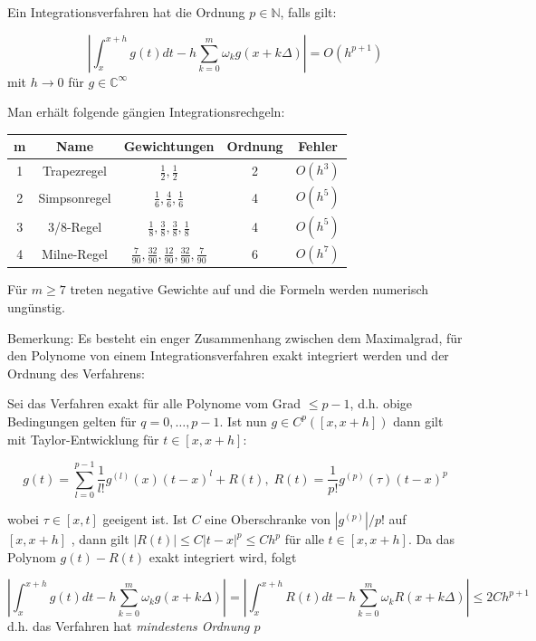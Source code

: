 \documentclass[10pt,a4paper]{article}
\begin{document}
\begin{defi}
Ein Integrationsverfahren hat die Ordnung $p \in \mathbb{N}$, falls gilt:

$$|\int^{x+h}_{x} g(t) dt - h \sum^{m}_{k=0} \omega_k g(x+k\Delta)| = O(h^{p+1})$$ mit $h \rightarrow 0$ für $g \in \mathbb{C}^{\infty}$
\end{defi}

Man erhält folgende gängien Integrationsrechgeln:

\begin{table}[H]
\centering
\begin{tabular}{ |c c c c c| }
\hline
  m & Name & Gewichtungen & Ordnung & Fehler \\
  \hline \hline
  1 & Trapezregel & $\frac{1}{2},\frac{1}{2}$ & 2 & $O(h^{3})$\\
  2 & Simpsonregel & $\frac{1}{6},\frac{4}{6},\frac{1}{6}$ & 4 & $O(h^{5})$\\
  3 & 3/8-Regel & $\frac{1}{8},\frac{3}{8},\frac{3}{8},\frac{1}{8}$ & 4 & $O(h^{5})$\\
  4 & Milne-Regel & $\frac{7}{90},\frac{32}{90},\frac{12}{90},\frac{32}{90},\frac{7}{90}$ &6 & $O(h^{7})$\\
  \hline
\end{tabular}
\end{table}

Für $m\geq 7$ treten negative Gewichte auf und die Formeln werden numerisch ungünstig.

Bemerkung: Es besteht ein enger Zusammenhang zwischen dem Maximalgrad, für den Polynome von einem Integrationsverfahren exakt integriert werden und der Ordnung des Verfahrens:

Sei das Verfahren exakt für alle Polynome vom Grad $\leq p-1$, d.h. obige Bedingungen gelten für $q=0,\ldots , p-1$. Ist nun $g \in C^{p}([x,x+h])$ dann gilt mit Taylor-Entwicklung für $t \in [x,x+h]$:

 $$g(t)=\sum_{l=0}^{p-1} \frac{1}{l!} g^{(l)}(x)(t-x)^{l}+R(t), \; R(t)=\frac{1}{p!}g^{(p)}(\tau)(t-x)^{p}$$

wobei $\tau \in [x,t]$ geeigent ist. Ist $C$ eine Oberschranke von $|g^{(p)}|/p!$ auf $[ x,x+h ] $ , dann gilt $|R(t)| \leq C|t-x|^{p} \leq Ch^{p}$ für alle $t \in [x,x+h]$. Da das Polynom $g(t)-R(t)$ exakt integriert wird, folgt

$$\left| \int^{x+h}_{x} g(t)dt - h \sum_{k=0}^{m} \omega_k g(x+k\Delta)\right| = \left| \int^{x+h}_{x} R(t)dt - h \sum_{k=0}^{m} \omega_k R(x+k\Delta)\right| \leq 2 Ch^{p+1}$$ d.h. das Verfahren hat \emph{mindestens Ordnung $p$}
\end{document}
